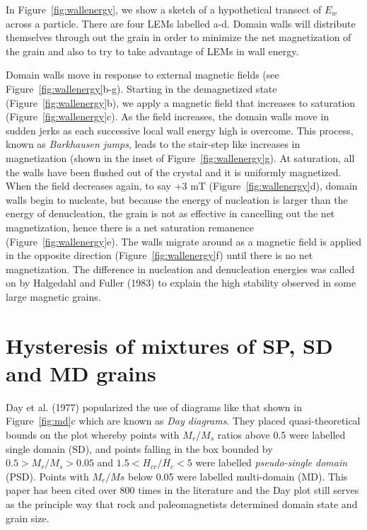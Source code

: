 In  Figure~\ref{fig:wallenergy}, we show a sketch of a hypothetical transect of  $E_w$ across a particle.  There are four LEMs labelled a-d.   Domain walls will distribute themselves through out the grain in order to minimize the net magnetization of the grain and also to try to take advantage of LEMs in wall energy.   

Domain walls move in response to external magnetic fields (see Figure~\ref{fig:wallenergy}b-g).   Starting in the demagnetized state  (Figure~\ref{fig:wallenergy}b), we apply a magnetic field that increases to saturation (Figure~\ref{fig:wallenergy}c).    As the field increases, the domain walls move in sudden jerks as each successive local wall energy high is overcome.  This process, known as {\it Barkhausen jumps},  leads to the stair-step like increases in magnetization (shown in the inset of  Figure~\ref{fig:wallenergy}g).  At saturation, all the walls have been flushed out of the crystal and it is uniformly magnetized.  When the field decreases again, to say +3 mT (Figure~\ref{fig:wallenergy}d), domain walls begin to nucleate, but because the energy of nucleation is larger than the energy of denucleation, the grain is not as effective in cancelling out the net magnetization, hence there is a net saturation remanence (Figure~\ref{fig:wallenergy}e).  The  walls migrate around as a magnetic field is applied in the opposite direction (Figure~\ref{fig:wallenergy}f) until there is no net magnetization.  The difference in nucleation and denucleation energies was called on by \nocite{halgedahl83}
Halgedahl and Fuller (1983) to explain the high stability observed in some large magnetic grains. 

\section{Hysteresis of mixtures of SP, SD and MD grains}
\label{sect:mixtures}

Day et al. (1977) \nocite{day77}  popularized the use of diagrams like that shown in Figure~\ref{fig:md}c which are known as
{\it Day diagrams}.   They placed quasi-theoretical bounds on the plot whereby points with $M_r/M_s$ ratios above 0.5 were labelled  single domain  (SD), and points falling in the box bounded by $0.5>M_r/M_s>0.05$ and $1.5<H_{cr}/H_c < 5$ were labelled
{\it pseudo-single domain}  (PSD).  Points with $M_r/Ms$ below 0.05 were labelled multi-domain (MD).    This paper has been cited over 800 times in the literature and the Day plot still serves as the principle way that rock and paleomagnetists determined domain state and grain size.  


